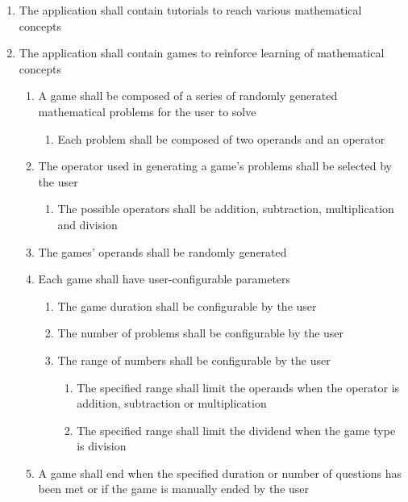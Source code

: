 \documentclass[12pt,letterpaper,oneside]{article}
\begin{document}
\begin{enumerate}
	\item
		The application shall contain tutorials to reach various mathematical concepts

	\item	%
		The application shall contain games to reinforce learning of mathematical concepts
		\begin{enumerate}
			\item	%
				A game shall be composed of a series of randomly generated mathematical problems for the user to solve
				\begin{enumerate}
					\item %
						Each problem shall be composed of two operands and an operator
				\end{enumerate}
			\item	%
				The operator used in generating a game's problems shall be selected by the user
				\begin{enumerate}
					\item %
						The possible operators shall be addition, subtraction, multiplication and division
				\end{enumerate}
			\item	%
				The games' operands shall be randomly generated
			\item	%
				Each game shall have user-configurable parameters
				\begin{enumerate}
					\item	%
						The game duration shall be configurable by the user
					\item	%
						The number of problems shall be configurable by the user
					\item	%
						The range of numbers shall be configurable by the user
						\begin{enumerate}
							\item %
								The specified range shall limit the operands when the operator is addition, subtraction or multiplication
							\item %
								The specified range shall limit the dividend when the game type is division
						\end{enumerate}
				\end{enumerate}
			\item	%
				A game shall end when the specified duration or number of questions has been met or if the game is manually ended by the user
		\end{enumerate}


\end{enumerate}
\end{document}
